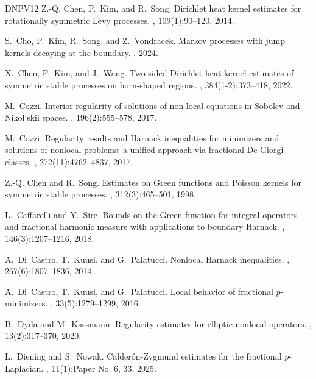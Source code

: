 \documentclass[11pt,reqno]{amsart}
\theoremstyle{plain}
\theoremstyle{definition}
\numberwithin{equation}{section}
\newcommand{\1}{\mathbbm{1}}
\begin{document}
\begin{thebibliography}{DNPV12}
Z.-Q. Chen, P.~Kim, and R.~Song.
\newblock Dirichlet heat kernel estimates for rotationally symmetric {L}\'evy
  processes.
, 109(1):90--120, 2014.

S.~Cho, P.~Kim, R.~Song, and Z.~Vondracek.
\newblock Markov processes with jump kernels decaying at the boundary.
, 2024.

X.~Chen, P.~Kim, and J.~Wang.
\newblock Two-sided {D}irichlet heat kernel estimates of symmetric stable
  processes on horn-shaped regions.
, 384(1-2):373--418, 2022.

M.~Cozzi.
\newblock Interior regularity of solutions of non-local equations in {S}obolev
  and {N}ikol'skii spaces.
, 196(2):555--578, 2017.

M.~Cozzi.
\newblock Regularity results and {H}arnack inequalities for minimizers and
  solutions of nonlocal problems: a unified approach via fractional {D}e
  {G}iorgi classes.
, 272(11):4762--4837, 2017.

Z.-Q. Chen and R.~Song.
\newblock Estimates on {G}reen functions and {P}oisson kernels for symmetric
  stable processes.
, 312(3):465--501, 1998.

L.~Caffarelli and Y.~Sire.
\newblock Bounds on the {G}reen function for integral operators and fractional
  harmonic measure with applications to boundary {H}arnack.
, 146(3):1207--1216, 2018.

A.~Di~Castro, T.~Kuusi, and G.~Palatucci.
\newblock Nonlocal {H}arnack inequalities.
, 267(6):1807--1836, 2014.

A.~Di~Castro, T.~Kuusi, and G.~Palatucci.
\newblock Local behavior of fractional {$p$}-minimizers.
,
  33(5):1279--1299, 2016.

B.~Dyda and M.~Kassmann.
\newblock Regularity estimates for elliptic nonlocal operators.
, 13(2):317--370, 2020.

L.~Diening and S.~Nowak.
\newblock Calder{\'o}n-{Z}ygmund estimates for the fractional $p$-{L}aplacian.
, 11(1):Paper No. 6, 33, 2025.


\end{thebibliography}
\end{document}
